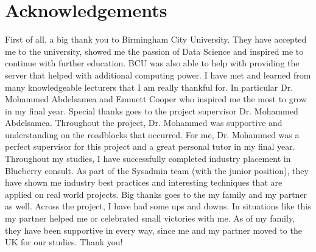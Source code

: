 \section*{Acknowledgements}
First of all, a big thank you to Birmingham City University. They have accepted me to the university, showed me the passion of Data Science and inspired me to continue with further education. BCU was also able to help with providing the server that helped with additional computing power. I have met and learned from many knowledgeable lecturers that I am really thankful for. In particular Dr. Mohammed Abdelsamea and Emmett Cooper who inspired me the most to grow in my final year.
\newline
\newline
Special thanks goes to the project supervisor Dr. Mohammed Abdelsamea. Throughout the project, Dr. Mohammed was supportive and understanding on the roadblocks that occurred. For me, Dr. Mohammed was a perfect supervisor for this project and a great personal tutor in my final year.
\newline
\newline
Throughout my studies, I have successfully completed industry placement in Blueberry consult. As part of the Sysadmin team (with the junior position), they have shown me industry best practices and interesting techniques that are applied on real world projects.
\newline
\newline
Big thanks goes to the my family and my partner as well. Across the project, I have had some ups and downs. In situations like this my partner helped me or celebrated small victories with me. As of my family, they have been supportive in every way, since me and my partner moved to the UK for our studies. Thank you!
\newpage